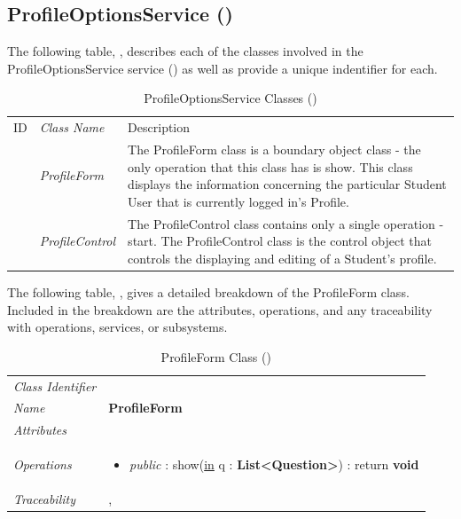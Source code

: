 \documentclass[12pt,letterpaper]{article}
\begin{document}
\subsection{ProfileOptionsService ()}

The following table, , describes each of the classes involved in the ProfileOptionsService service () as well as provide a unique indentifier for each.

\begin{table}[H]
	\caption{ProfileOptionsService Classes ()} 
	\begin{tabu} to 
	    \tableheader{}ID & Class Name & Description \\
		 & ProfileForm & The ProfileForm class is a boundary object class - the only operation that this class has is show. This class displays the information concerning the particular Student User that is currently logged in's Profile.\\
		 & ProfileControl & The ProfileControl class contains only a single operation - start. The ProfileControl class is the control object that controls the displaying and editing of a Student's profile. \\
	\end{tabu}
\end{table}

\newpage{}
The following table, , gives a detailed breakdown of the ProfileForm class. Included in the breakdown are the attributes, operations, and any traceability with operations, services, or subsystems.

\begin{table}[H]
    \caption{ProfileForm Class ()} 
	\begin{tabu} to 
		\toprule
		Class Identifier &  \\
		Name & {\bf ProfileForm} \\
		Attributes & \\

		Operations &
		\begin{minipage}[t]{\linewidth}
			\begin{itemize}
			    \item {\it public} : show(\underline{in} q : {\bf List<Question>}) : return {\bf void}
	        \end{itemize}
	    \end{minipage} \\
	    	Traceability & , \\
		\toprule
	\end{tabu}
\end{table}
\end{document}
